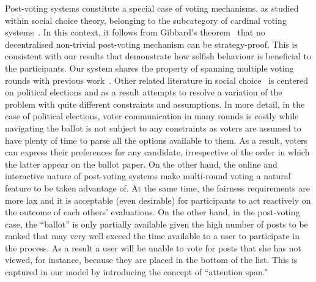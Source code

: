 Post-voting systems constitute a special case of voting mechanisms, as studied within social choice theory, belonging to the subcategory of cardinal voting systems~\cite{hillinger2005case}. In this context, it follows from Gibbard's theorem~\cite{gibbard1973manipulation} that no decentralised non-trivial
post-voting mechanism can be strategy-proof. This is consistent with our results that
demonstrate how selfish behaviour is beneficial to the participants. Our system shares the property of spanning multiple voting rounds with previous work~\cite{kalech2011practical}. Other related literature in social choice~\cite{lu2011robust,conitzer2005communication,xia2010compilation} is centered on political elections and as a result attempts to resolve a variation of the problem with quite different constraints and assumptions. In more detail, in the case of political elections, voter communication in many rounds is costly while navigating the ballot is not subject to any constraints as voters are assumed to have plenty of time to parse all the options available to them. As a result, voters can express their preferences for any candidate, irrespective of the order in which the latter appear on the ballot paper. On the other hand, the online and interactive nature of post-voting systems make multi-round voting a natural feature to be taken advantage of. At the same time, the fairness requirements are more lax and it is acceptable (even desirable) for participants to act reactively on the outcome of each others' evaluations. On the other hand, in the post-voting case, the ``ballot'' is only partially available given the high number of posts to be ranked that may very well exceed the time available to a user to participate in the process. As a result a user will be unable to vote for posts that she has not viewed, for instance, because they are placed in the bottom of the list. This is captured in our model by introducing the concept of ``attention span.''

